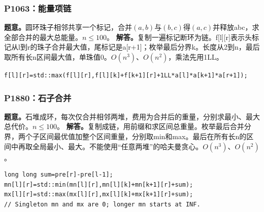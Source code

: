 \subsubsection{P1063：能量项链}
\textbf{题意。}圆环珠子相邻共享一个标记，合并$(a,b)$与$(b,c)$得$(a,c)$并释放abc，求全部合并的最大总能量。$n\le100$。
\textbf{解答。}复制一遍标记断环为链。f[l][r]表示头标记从l到r的珠子合并最大值，尾标记是a[r+1]；枚举最后分界k。长度从2到n，最后取所有长n区间最大值，单珠值0。$O(n^3)$、$O(n^2)$，乘法先用1LL。
\begin{lstlisting}
f[l][r]=std::max(f[l][r],f[l][k]+f[k+1][r]+1LL*a[l]*a[k+1]*a[r+1]);
\end{lstlisting}

\subsubsection{P1880：石子合并}
\textbf{题意。}石堆成环，每次仅合并相邻两堆，费用为合并后的重量，分别求最小、最大总代价。$n\le100$。
\textbf{解答。}复制成链，用前缀和求区间总重量。枚举最后合并分界，两个子区间最优值加整个区间重量，分别取min和max。最后在所有长n的区间中再取全局最小、最大。不能使用“任意两堆”的哈夫曼贪心。$O(n^3)$、$O(n^2)$。
\begin{lstlisting}
long long sum=pre[r]-pre[l-1];
mn[l][r]=std::min(mn[l][r],mn[l][k]+mn[k+1][r]+sum);
mx[l][r]=std::max(mx[l][r],mx[l][k]+mx[k+1][r]+sum);
// Singleton mn and mx are 0; longer mn starts at INF.
\end{lstlisting}
